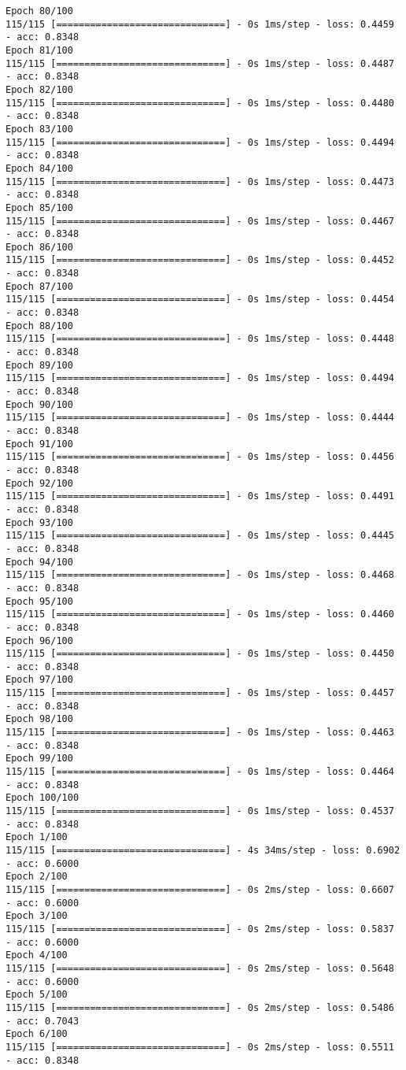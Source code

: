 \documentclass[11pt]{article}
\begin{document}
\begin{Verbatim}[commandchars=\\\{\}]
Epoch 80/100
115/115 [==============================] - 0s 1ms/step - loss: 0.4459 - acc: 0.8348
Epoch 81/100
115/115 [==============================] - 0s 1ms/step - loss: 0.4487 - acc: 0.8348
Epoch 82/100
115/115 [==============================] - 0s 1ms/step - loss: 0.4480 - acc: 0.8348
Epoch 83/100
115/115 [==============================] - 0s 1ms/step - loss: 0.4494 - acc: 0.8348
Epoch 84/100
115/115 [==============================] - 0s 1ms/step - loss: 0.4473 - acc: 0.8348
Epoch 85/100
115/115 [==============================] - 0s 1ms/step - loss: 0.4467 - acc: 0.8348
Epoch 86/100
115/115 [==============================] - 0s 1ms/step - loss: 0.4452 - acc: 0.8348
Epoch 87/100
115/115 [==============================] - 0s 1ms/step - loss: 0.4454 - acc: 0.8348
Epoch 88/100
115/115 [==============================] - 0s 1ms/step - loss: 0.4448 - acc: 0.8348
Epoch 89/100
115/115 [==============================] - 0s 1ms/step - loss: 0.4494 - acc: 0.8348
Epoch 90/100
115/115 [==============================] - 0s 1ms/step - loss: 0.4444 - acc: 0.8348
Epoch 91/100
115/115 [==============================] - 0s 1ms/step - loss: 0.4456 - acc: 0.8348
Epoch 92/100
115/115 [==============================] - 0s 1ms/step - loss: 0.4491 - acc: 0.8348
Epoch 93/100
115/115 [==============================] - 0s 1ms/step - loss: 0.4445 - acc: 0.8348
Epoch 94/100
115/115 [==============================] - 0s 1ms/step - loss: 0.4468 - acc: 0.8348
Epoch 95/100
115/115 [==============================] - 0s 1ms/step - loss: 0.4460 - acc: 0.8348
Epoch 96/100
115/115 [==============================] - 0s 1ms/step - loss: 0.4450 - acc: 0.8348
Epoch 97/100
115/115 [==============================] - 0s 1ms/step - loss: 0.4457 - acc: 0.8348
Epoch 98/100
115/115 [==============================] - 0s 1ms/step - loss: 0.4463 - acc: 0.8348
Epoch 99/100
115/115 [==============================] - 0s 1ms/step - loss: 0.4464 - acc: 0.8348
Epoch 100/100
115/115 [==============================] - 0s 1ms/step - loss: 0.4537 - acc: 0.8348
Epoch 1/100
115/115 [==============================] - 4s 34ms/step - loss: 0.6902 - acc: 0.6000
Epoch 2/100
115/115 [==============================] - 0s 2ms/step - loss: 0.6607 - acc: 0.6000
Epoch 3/100
115/115 [==============================] - 0s 2ms/step - loss: 0.5837 - acc: 0.6000
Epoch 4/100
115/115 [==============================] - 0s 2ms/step - loss: 0.5648 - acc: 0.6000
Epoch 5/100
115/115 [==============================] - 0s 2ms/step - loss: 0.5486 - acc: 0.7043
Epoch 6/100
115/115 [==============================] - 0s 2ms/step - loss: 0.5511 - acc: 0.8348

\end{Verbatim}
\end{document}
